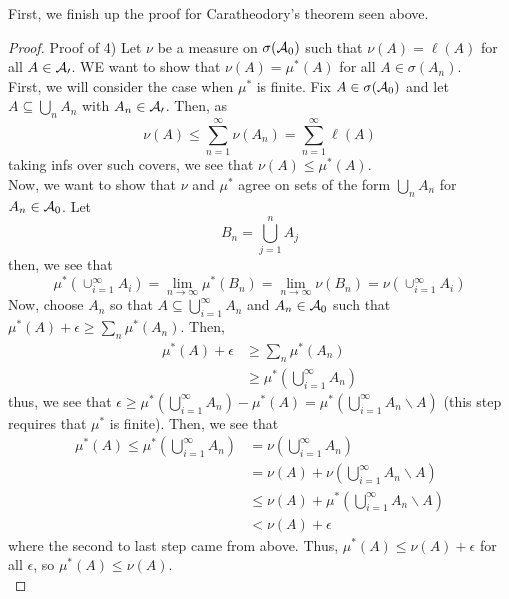 
First, we finish up the proof for Caratheodory's theorem seen above.\\

\begin{proof}{Proof of 4)}
    Let $\nu$ be a measure on $\sigma(\cal{A}_0)$ such that $\nu(A) = \ell(A)$ for all $A \in \cal{A_0}$. WE want to show that $\nu(A) = \mu^{*}(A)$ for all $A \in \sigma(A_n)$.\\

    First, we will consider the case when $\mu^{*}$ is finite. Fix $A \in \sigma(\cal{A}_0)$ and let $A \subseteq \bigcup_{n} A_n$ with $A_n \in \cal{A_0}$. Then, as 
    \[ \nu(A) \leq \sum_{n = 1}^{\infty} \nu(A_n) = \sum_{n = 1}^{\infty} \ell(A) \]
    taking infs over such covers, we see that $\nu(A) \leq \mu^{*}(A)$.\\

    Now, we want to show that $\nu$ and $\mu^{*}$ agree on sets of the form $\bigcup_{n} A_n$ for $A_n \in \cal{A}_0$. Let
    \[ B_n = \bigcup_{j = 1}^{n} A_j \]
    then, we see that
    \[ \mu^{*}(\cup_{i = 1}^{\infty} A_i) = \lim_{n \to \infty} \mu^{*}(B_n) = \lim_{n \to \infty} \nu(B_n) = \nu(\cup_{i = 1}^{\infty} A_i) \]
    Now, choose $A_n$ so that $A \subseteq \bigcup_{i = 1}^{\infty} A_n$ and $A_n \in \cal{A}_0$ such that $\mu^{*}(A) + \epsilon \geq \sum_{n} \mu^{*}(A_n)$. Then, 
    \begin{align*}
        \mu^{*}(A) + \epsilon &\geq \sum_{n} \mu^{*}(A_n)\\
        &\geq \mu^{*}\left(\bigcup_{i = 1}^{\infty} A_n\right)
    \end{align*}
    thus, we see that $\epsilon \geq \mu^{*}\left(\bigcup_{i = 1}^{\infty} A_n\right) - \mu^{*}(A) = \mu^{*}(\bigcup_{i = 1}^{\infty} A_n \backslash A)$ (this step requires that $\mu^{*}$ is finite). Then, we see that
    \begin{align*}
        \mu^{*}(A) \leq \mu^{*}(\bigcup_{i = 1}^{\infty} A_n) &= \nu(\bigcup_{i = 1}^{\infty} A_n)\\
        &= \nu(A) + \nu(\bigcup_{i = 1}^{\infty} A_n \backslash A)\\
        &\leq \nu(A) + \mu^{*}(\bigcup_{i =1}^{\infty} A_n \backslash A)\\
        &< \nu(A) + \epsilon
    \end{align*}
    where the second to last step came from above. Thus, $\mu^{*}(A) \leq \nu(A) + \epsilon$ for all $\epsilon$, so $\mu^{*}(A) \leq \nu(A)$.\\


\end{proof}
